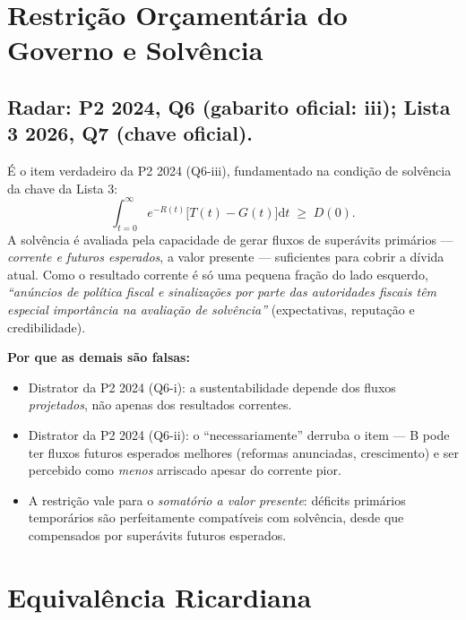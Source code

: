 \documentclass[12pt, a4paper]{article}
\newcommand{\dif}{\mathrm{d}}
\begin{document}
\section{Restrição Orçamentária do Governo e Solvência}

\subsection{Radar: P2 2024, Q6 (gabarito oficial: iii); Lista 3 2026, Q7 (chave oficial).}

\begin{correctbox}[title={Resposta correta: c)}]
É o item verdadeiro da P2 2024 (Q6-iii), fundamentado na condição de solvência
da chave da Lista 3:
\[
\int_{t=0}^{\infty} e^{-R(t)}\bigl[T(t) - G(t)\bigr]\dif t \;\geq\; D(0).
\]
A solvência é avaliada pela capacidade de gerar fluxos de superávits primários
--- \emph{corrente e futuros esperados}, a valor presente --- suficientes para
cobrir a dívida atual. Como o resultado corrente é só uma pequena fração do
lado esquerdo, \emph{``anúncios de política fiscal e sinalizações por parte das
autoridades fiscais têm especial importância na avaliação de solvência''}
(expectativas, reputação e credibilidade). \checkmark

\textbf{Por que as demais são falsas:}
\begin{itemize}[leftmargin=*]
\item[a)] Distrator da P2 2024 (Q6-i): a sustentabilidade depende dos fluxos
\emph{projetados}, não apenas dos resultados correntes.
\item[b)] Distrator da P2 2024 (Q6-ii): o ``necessariamente'' derruba o item
--- B pode ter fluxos futuros esperados melhores (reformas anunciadas,
crescimento) e ser percebido como \emph{menos} arriscado apesar do corrente
pior.
\item[d)] A restrição vale para o \emph{somatório a valor presente}: déficits
primários temporários são perfeitamente compatíveis com solvência, desde que
compensados por superávits futuros esperados.
\end{itemize}
\end{correctbox}

\section{Equivalência Ricardiana}
\end{document}
